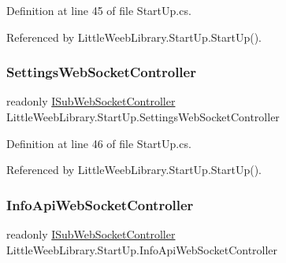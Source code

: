 Definition at line 45 of file Start\+Up.\+cs.



Referenced by Little\+Weeb\+Library.\+Start\+Up.\+Start\+Up().

\mbox{\label{class_little_weeb_library_1_1_start_up_a2c80109780ba0dc7597ad400327dc25f}} 
\subsubsection{\texorpdfstring{Settings\+Web\+Socket\+Controller}{SettingsWebSocketController}}
{\footnotesize\ttfamily readonly \mbox{\hyperlink{interface_little_weeb_library_1_1_controllers_1_1_i_sub_web_socket_controller}{I\+Sub\+Web\+Socket\+Controller}} Little\+Weeb\+Library.\+Start\+Up.\+Settings\+Web\+Socket\+Controller\hspace{0.3cm}{\ttfamily [private]}}



Definition at line 46 of file Start\+Up.\+cs.



Referenced by Little\+Weeb\+Library.\+Start\+Up.\+Start\+Up().

\mbox{\label{class_little_weeb_library_1_1_start_up_a85ff0dfe3a4216d8ebdc822744566cb3}} 
\subsubsection{\texorpdfstring{Info\+Api\+Web\+Socket\+Controller}{InfoApiWebSocketController}}
{\footnotesize\ttfamily readonly \mbox{\hyperlink{interface_little_weeb_library_1_1_controllers_1_1_i_sub_web_socket_controller}{I\+Sub\+Web\+Socket\+Controller}} Little\+Weeb\+Library.\+Start\+Up.\+Info\+Api\+Web\+Socket\+Controller\hspace{0.3cm}{\ttfamily [private]}}



